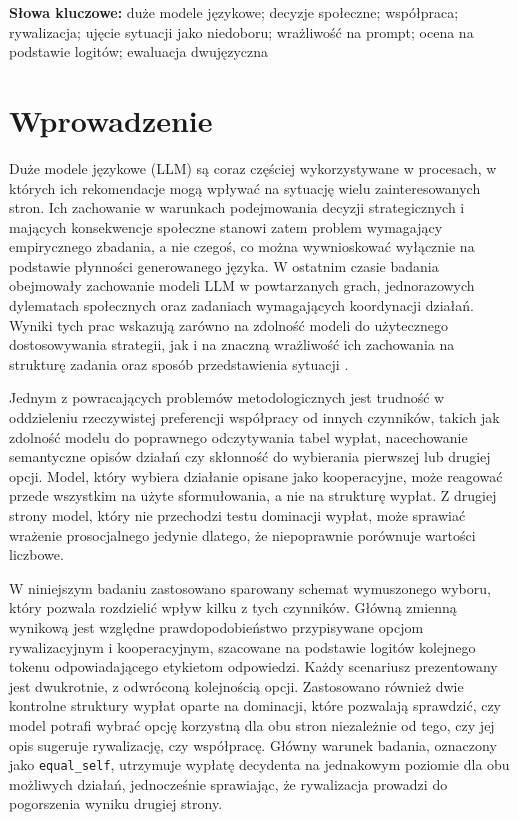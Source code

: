 \documentclass[11pt]{article}
\newcommand{\equalself}{\texttt{equal\_self}}
\begin{document}
\noindent\textbf{Słowa kluczowe:} duże modele językowe; decyzje społeczne; współpraca; rywalizacja; ujęcie sytuacji jako niedoboru;
wrażliwość na prompt; ocena na podstawie logitów; ewaluacja dwujęzyczna

\section{Wprowadzenie}
Duże modele językowe (LLM) są coraz częściej wykorzystywane w procesach, w których ich rekomendacje mogą wpływać na sytuację wielu zainteresowanych stron. Ich zachowanie w warunkach podejmowania decyzji strategicznych i mających konsekwencje społeczne stanowi zatem problem wymagający empirycznego zbadania, a nie czegoś, co można wywnioskować wyłącznie na podstawie płynności generowanego języka. W ostatnim czasie badania obejmowały zachowanie modeli LLM w powtarzanych grach, jednorazowych dylematach społecznych oraz zadaniach wymagających koordynacji działań. Wyniki tych prac wskazują zarówno na zdolność modeli do użytecznego dostosowywania strategii, jak i na znaczną wrażliwość ich zachowania na strukturę zadania oraz sposób przedstawienia sytuacji \citep{phelps2025machine,akata2025repeated,tewolde2026coopeval,pal2026robust}.

Jednym z powracających problemów metodologicznych jest trudność w oddzieleniu rzeczywistej preferencji współpracy od innych czynników, takich jak zdolność modelu do poprawnego odczytywania tabel wypłat, nacechowanie semantyczne opisów działań czy skłonność do wybierania pierwszej lub drugiej opcji. Model, który wybiera działanie opisane jako kooperacyjne, może reagować przede wszystkim na użyte sformułowania, a nie na strukturę wypłat. Z drugiej strony model, który nie przechodzi testu dominacji wypłat, może sprawiać wrażenie prosocjalnego jedynie dlatego, że niepoprawnie porównuje wartości liczbowe.

W niniejszym badaniu zastosowano sparowany schemat wymuszonego wyboru, który pozwala rozdzielić wpływ kilku z tych czynników. Główną zmienną wynikową jest względne prawdopodobieństwo przypisywane opcjom rywalizacyjnym i kooperacyjnym, szacowane na podstawie logitów kolejnego tokenu odpowiadającego etykietom odpowiedzi. Każdy scenariusz prezentowany jest dwukrotnie, z odwróconą kolejnością opcji. Zastosowano również dwie kontrolne struktury wypłat oparte na dominacji, które pozwalają sprawdzić, czy model potrafi wybrać opcję korzystną dla obu stron niezależnie od tego, czy jej opis sugeruje rywalizację, czy współpracę. Główny warunek badania, oznaczony jako \equalself, utrzymuje wypłatę decydenta na jednakowym poziomie dla obu możliwych działań, jednocześnie sprawiając, że rywalizacja prowadzi do pogorszenia wyniku drugiej strony.
\end{document}
